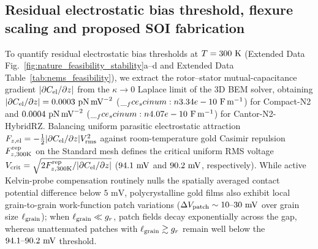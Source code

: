 \documentclass[pdflatex,sn-nature]{sn-jnl}
\DeclareRobustCommand{\scinum}[1]{\__fce_scinum:n{#1}}
\DeclareRobustCommand{\roundone}[1]{\fpeval{round(#1,1)}}
\DeclareRobustCommand{\roundfour}[1]{\fpeval{round(#1,4)}}
\begin{document}
\subsection*{Residual electrostatic bias threshold, flexure scaling and proposed SOI fabrication}
To quantify residual electrostatic bias thresholds at $T = 300{}\text{ K}$ (Extended Data Fig.~\ref{fig:nature_feasibility_stability}a--d and Extended Data Table~\ref{tab:nems_feasibility}), we extract the rotor--stator mutual-capacitance gradient $|\partial C_{\rm el}/\partial z|$ from the $\kappa \to 0$ Laplace limit of the 3D BEM solver, obtaining $|\partial C_{\rm el}/\partial z| = \roundfour{\NatureRotCeightCompactNtwoPatchPotentialAbsDcDzPnPerMvtwo}\text{ pN}\,\text{mV}^{-2}$ ($\scinum{\NatureRotCeightCompactNtwoPatchPotentialDcDzFPerM}\text{ F}\,\text{m}^{-1}$) for Compact-N2 and $\roundfour{\NatureCantorNtwoHybridrzPatchPotentialAbsDcDzPnPerMvtwo}\text{ pN}\,\text{mV}^{-2}$ ($\scinum{\NatureCantorNtwoHybridrzPatchPotentialDcDzFPerM}\text{ F}\,\text{m}^{-1}$) for Cantor-N2-HybridRZ. Balancing uniform parasitic electrostatic attraction $F_{z,\rm el} = -\frac{1}{2}|\partial C_{\rm el}/\partial z|V_{\rm rms}^2$ against room-temperature gold Casimir repulsion $F_{z,300\rm K}^{\rm rep}$ on the Standard mesh defines the critical uniform RMS voltage $V_{\rm crit} = \sqrt{2 F_{z,300\rm K}^{\rm rep}/|\partial C_{\rm el}/\partial z|}$ ($\roundone{\NatureRotCeightCompactNtwoPatchPotentialVCritMv}\text{ mV}$ and $\roundone{\NatureCantorNtwoHybridrzPatchPotentialVCritMv}\text{ mV}$, respectively). While active Kelvin-probe compensation routinely nulls the spatially averaged contact potential difference below $5\text{ mV}$, polycrystalline gold films also exhibit local grain-to-grain work-function patch variations ($\Delta V_{\rm patch} \sim 10\text{--}30\text{ mV}$ over grain size $\ell_{\rm grain}$); when $\ell_{\rm grain} \ll g_r$, patch fields decay exponentially across the gap, whereas unattenuated patches with $\ell_{\rm grain} \gtrsim g_r$ remain well below the $\roundone{\NatureRotCeightCompactNtwoPatchPotentialVCritMv}\text{--}\roundone{\NatureCantorNtwoHybridrzPatchPotentialVCritMv}\text{ mV}$ threshold.
\end{document}
